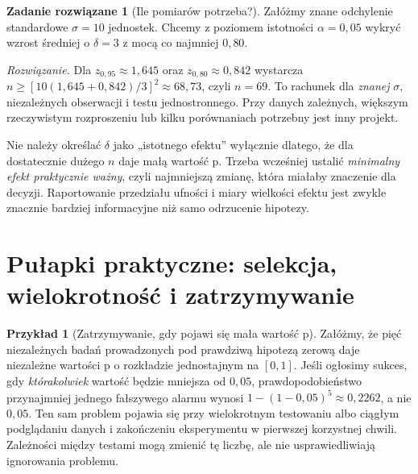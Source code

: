\documentclass[11pt,a4paper,oneside]{report}
\numberwithin{equation}{chapter}
\theoremstyle{plain}
\theoremstyle{definition}
\newtheorem{przyklad}{Przykład}[chapter]
\newtheorem{zadanie}{Zadanie rozwiązane}[chapter]
\theoremstyle{remark}
\begin{document}
\begin{zadanie}[Ile pomiarów potrzeba?]
Załóżmy znane odchylenie standardowe $\sigma=10$ jednostek.
Chcemy z poziomem istotności $\alpha=0{,}05$ wykryć wzrost
średniej o $\delta=3$ z mocą co najmniej $0{,}80$.
\par\emph{Rozwiązanie.} Dla $z_{0{,}95}\approx1{,}645$
oraz $z_{0{,}80}\approx0{,}842$ wystarcza
$n\ge[10(1{,}645+0{,}842)/3]^2\approx68{,}73$,
czyli $n=69$. To rachunek dla \emph{znanej} $\sigma$,
niezależnych obserwacji i testu jednostronnego. Przy danych
zależnych, większym rzeczywistym rozproszeniu lub kilku
porównaniach potrzebny jest inny projekt.
\end{zadanie}

Nie należy określać $\delta$ jako „istotnego efektu” wyłącznie
dlatego, że dla dostatecznie dużego $n$ daje małą wartość p.
Trzeba wcześniej ustalić \emph{minimalny efekt praktycznie ważny},
czyli najmniejszą zmianę, która miałaby znaczenie dla decyzji.
Raportowanie przedziału ufności i miary wielkości efektu jest
zwykle znacznie bardziej informacyjne niż samo odrzucenie hipotezy.

\section{Pułapki praktyczne: selekcja, wielokrotność i zatrzymywanie}
\begin{przyklad}[Zatrzymywanie, gdy pojawi się mała wartość p]
Załóżmy, że pięć niezależnych badań prowadzonych pod prawdziwą
hipotezą zerową daje niezależne wartości p o rozkładzie
jednostajnym na $[0,1]$. Jeśli ogłosimy sukces, gdy
\emph{którakolwiek} wartość będzie mniejsza od $0{,}05$,
prawdopodobieństwo przynajmniej jednego fałszywego alarmu wynosi
$1-(1-0{,}05)^5\approx0{,}2262$, a nie $0{,}05$.
Ten sam problem pojawia się przy wielokrotnym testowaniu albo
ciągłym podglądaniu danych i zakończeniu eksperymentu w
pierwszej korzystnej chwili. Zależności między testami mogą
zmienić tę liczbę, ale nie usprawiedliwiają ignorowania problemu.
\end{przyklad}
\end{document}
